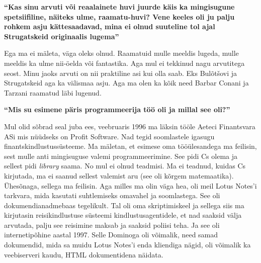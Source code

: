 \textbf{\enquote{Kas sinu arvuti või reaalainete huvi juurde käis ka 
mingisugune spetsiifiline, näiteks ulme, raamatu-huvi? Vene keeles oli ju palju 
rohkem asju kättesaadavad, mina ei olnud suuteline tol ajal Strugatskeid 
originaalis lugema}}

Ega ma ei mäleta, väga oleks olnud. Raamatuid mulle meeldis lugeda, mulle 
meeldis ka ulme nii-öelda või fantastika. Aga mul ei tekkinud nagu arvutitega 
seost. Minu jaoks arvuti on nii praktiline asi kui olla saab. Eks 
Bulõtšovi ja Strugatskeid aga ka 
välismaa asju. Aga ma olen ka kõik need Barbar Conani ja Tarzani raamatud läbi lugenud.

\textbf{\enquote{Mis su esimene päris programmeerija töö oli ja millal see 
oli?}}

Mul olid sõbrad seal juba ees, veebruaris 1996 ma läksin tööle Aeteci
Finantsvara ASi mis nüüdseks 
on Profit Software. Nad tegid soomlastele igasugu 
finantskindlustussüsteeme. Ma mäletan, et esimese oma tööülesandega ma 
feilisin, sest mulle anti mingisuguse
valemi programmeerimine. See pidi Cs olema ja sellest pidi 
\emph{library} saama. No mul ei olnud teadmisi. Ma ei teadnud, kuidas Cs 
kirjutada, ma ei saanud sellest valemist aru (see oli kõrgem matemaatika). 
Ühesõnaga, sellega ma feilisin. Aga milles ma olin väga hea, oli meil Lotus 
Notes'i tarkvara, mida kasutati suhtlemiseks omavahel 
ja soomlastega. See oli dokumendianadmebaas tegelikult. Tal oli oma 
skriptimiskeel ja sellega siis ma kirjutasin reisikindlustuse süsteemi 
kindlustusagentidele, et nad saaksid välja arvutada, palju see reisimine maksab 
ja saaksid poliisi teha. Ja see oli internetipõhine aastal 1997. Selle Dominoga 
oli võimalik, need samad dokumendid, mida sa muidu Lotus Notes'i enda kliendiga 
nägid, oli võimalik ka veebiserveri kaudu, HTML dokumentidena näidata.

